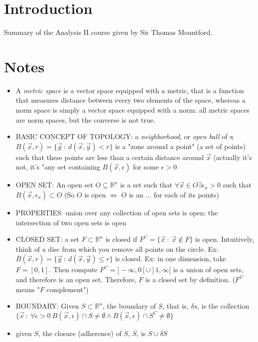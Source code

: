 \documentclass{article}
\begin{document}
\section*{Introduction}
Summary of the Analysis II course given by Sir Thomas Mountford.

\section{Notes}

\begin{itemize}
	\item A \emph{metric space} is a vector space equipped with a metric, that is a function that measures distance between every two elements of the space, whereas a norm space is simply a vector space equipped with a norm: all metric spaces are norm spaces, but the converse is not true.
	\item BASIC CONCEPT OF TOPOLOGY: a \emph{neighborhood}, or \emph{open ball} of x $B(\vec x, r) = \{\vec y \ : \ d(\vec x, \vec y) < r\}$ is a "zone around a point" (a set of points) such that these points are less than a certain distance around $\vec x$ (actually it's not, it's "any set containing $B(\vec x, \epsilon)$ for some $\epsilon > 0$
	\item OPEN SET: An open set $O \subseteq \mathbb{R}^n$ is a set such that $\forall \vec x \in O \exists \epsilon_x > 0$ such that $B(\vec x, \epsilon_x) \subset O$ (So $O$ is open $\iff$ $O$ is an ... for each of its points)
	\item PROPERTIES: union over any collection of open sets is open; the intersection of two open sets is open
	\item CLOSED SET: a set $F \subset \mathbb{R}^n$ is closed if $F^C = \{\vec x \ : \ \vec x \notin F\}$ is open. Intuitively, think of a disc from which you remove all points on the circle. Ex: $\overline{B} (\vec x, r) = \{\vec y \ : \ d(\vec x, \vec y) \leq r\}$ is closed. Ex: in one dimension, take $F = [0, 1]$. Then compute $F^C = ]-\infty, 0[ \cup ]1, \infty[$ is a union of open sets, and therefore is an open set. Therefore, $F$ is a closed set by definition. ($F^C$ means "$F$ complement")
	\item BOUNDARY: Given $S \subset \mathbb{R}^n$, the boundary of $S$, that is, $\delta s$, is the collection $\{\vec x \ : \ \forall \epsilon > 0 \ B(\vec x, \epsilon) \cap S \neq \emptyset \land B(\vec x, \epsilon) \cap S^C \neq \emptyset\}$
	\item given $S$, the closure (adherence) of $S$, $\overline S$, is $S \cup \delta S$
\end{itemize}
\end{document}
